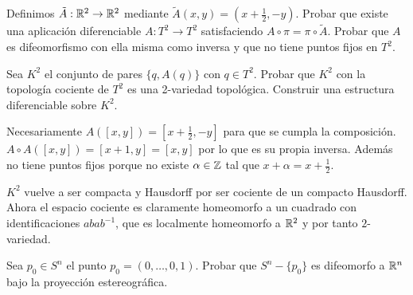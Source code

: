 \documentclass[twoside]{article}
\begin{document}
\begin{ejercicio}{8.5}
Definimos $\tilde{A}:\mathbb{R}^2\to\mathbb{R}^2$ mediante $\tilde{A}(x,y)=(x+\frac{1}{2}, -y)$. Probar que existe una aplicación diferenciable $A:T^2\to T^2$ satisfaciendo $A\circ\pi =\pi\circ \tilde{A}$. Probar que $A$ es difeomorfismo con ella misma como inversa y que no tiene puntos fijos en $T^2$. 

Sea $K^2$ el conjunto de pares $\{q,A(q)\}$ con $q\in T^2$. Probar que $K^2$ con la topología cociente de $T^2$ es una 2-variedad topológica. Construir una estructura diferenciable sobre $K^2$.
\end{ejercicio}
\begin{solucion}
Necesariamente $A([x,y])=[x+\frac{1}{2}, -y]$ para que se cumpla la composición. $A\circ A([x,y])=[x+1,y]=[x,y]$ por lo que es su propia inversa. Además no tiene puntos fijos porque no existe $\alpha\in\mathbb{Z}$ tal que $x+\alpha=x+\frac{1}{2}$.

$K^2$ vuelve a ser compacta y Hausdorff por ser cociente de un compacto Hausdorff. Ahora el espacio cociente es claramente homeomorfo a un cuadrado con identificaciones $abab^{-1}$, que es localmente homeomorfo a $\mathbb{R}^2$ y por tanto $2$-variedad.
\end{solucion}

\newpage

\begin{ejercicio}{8.6}
Sea $p_0\in S^n$  el punto $p_0=(0,\dots, 0,1)$. Probar que $S^n-\{p_0\}$ es difeomorfo a $\mathbb{R}^n$ bajo la proyección estereográfica. 
\end{ejercicio}
\begin{solucion}
\end{solucion}
\end{document}

